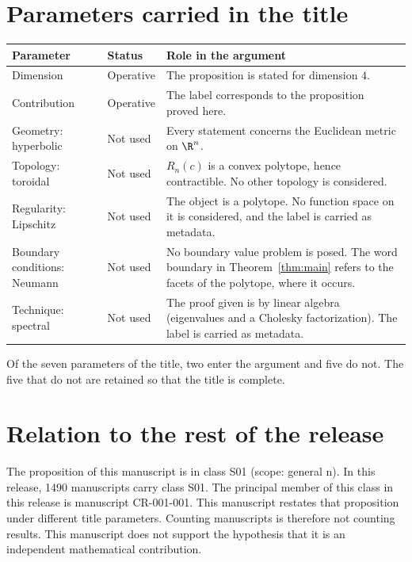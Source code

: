 \documentclass[11pt]{article}
\begin{document}
\section{Parameters carried in the title}\label{sec:params}
\begin{center}
\small
\begin{tabular}{p{}p{}p{}}
\toprule
Parameter & Status & Role in the argument \\
\midrule
Dimension & Operative & The proposition is stated for dimension $4$. \\
Contribution & Operative & The label corresponds to the proposition proved here. \\
Geometry: hyperbolic & Not used & Every statement concerns the Euclidean metric on $\R^n$. \\
Topology: toroidal & Not used & $R_n(c)$ is a convex polytope, hence contractible. No other topology is considered. \\
Regularity: Lipschitz & Not used & The object is a polytope. No function space on it is considered, and the label is carried as metadata. \\
Boundary conditions: Neumann & Not used & No boundary value problem is posed. The word boundary in Theorem~\ref{thm:main} refers to the facets of the polytope, where it occurs. \\
Technique: spectral & Not used & The proof given is by linear algebra (eigenvalues and a Cholesky factorization). The label is carried as metadata. \\
\bottomrule
\end{tabular}
\end{center}
Of the seven parameters of the title, two enter the argument and five do not. The five that do not are retained so that the title is complete.

\section{Relation to the rest of the release}
The proposition of this manuscript is in class S01 (scope: general n).
In this release, 1490 manuscripts carry class S01. The principal member of this class in this release is manuscript CR-001-001. This manuscript restates that proposition under different title parameters.
Counting manuscripts is therefore not counting results. This manuscript does not support the hypothesis that it is an independent mathematical contribution.
\end{document}
